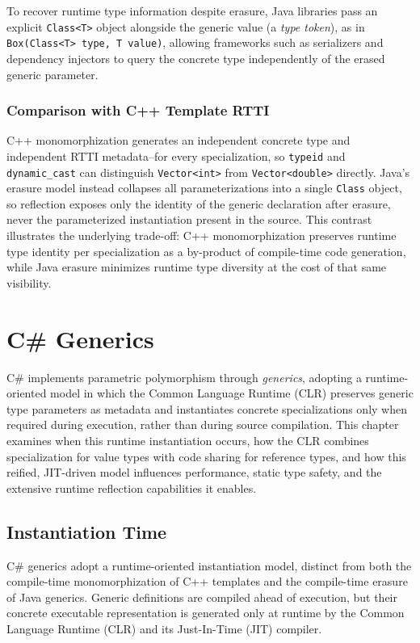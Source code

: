 \documentclass[11pt]{report}
\begin{document}
To recover runtime type information despite erasure, Java libraries pass an
explicit \texttt{Class<T>} object alongside the generic value (a
\emph{type token}), as in \texttt{Box(Class<T> type, T value)}, allowing
frameworks such as serializers and dependency injectors to query the
concrete type independently of the erased generic parameter.

\subsection{Comparison with C++ Template RTTI}
\label{JavaGenerics:Reflection:CppTemplate}
C++ monomorphization generates an independent concrete type and
independent RTTI metadata--for every specialization, so \texttt{typeid} and
\texttt{dynamic\_cast} can distinguish \texttt{Vector<int>} from
\texttt{Vector<double>} directly. Java's erasure model instead collapses
all parameterizations into a single \texttt{Class} object, so reflection
exposes only the identity of the generic declaration after erasure, never
the parameterized instantiation present in the source. This contrast
illustrates the underlying trade-off: C++ monomorphization preserves
runtime type identity per specialization as a by-product of compile-time
code generation, while Java erasure minimizes runtime type diversity at the
cost of that same visibility.
\chapter{C\# Generics}
\label{CSharpGenerics}
C\# implements parametric polymorphism through \emph{generics}, adopting a
runtime-oriented model in which the Common Language Runtime (CLR)
preserves generic type parameters as metadata and instantiates concrete
specializations only when required during execution, rather than during
source compilation. This chapter examines when this runtime instantiation
occurs, how the CLR combines specialization for value types with code
sharing for reference types, and how this reified, JIT-driven model
influences performance, static type safety, and the extensive runtime
reflection capabilities it enables.
\section{Instantiation Time}

C\# generics adopt a runtime-oriented instantiation model, distinct from both
the compile-time monomorphization of C++ templates and the compile-time
erasure of Java generics. Generic definitions are compiled ahead of
execution, but their concrete executable representation is generated only at
runtime by the Common Language Runtime (CLR) and its Just-In-Time (JIT)
compiler.
\end{document}
